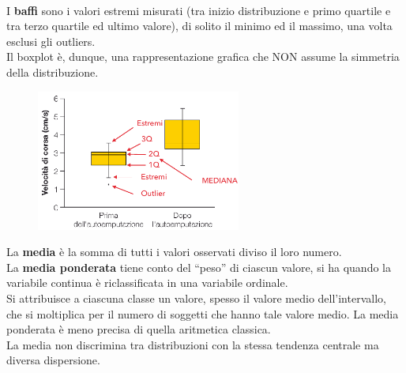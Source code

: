 \documentclass[10pt, draft]{book}
\begin{document}
\\
I \textbf{baffi} sono i valori estremi misurati (tra inizio distribuzione e primo quartile e tra terzo quartile ed ultimo valore), di solito il minimo ed il massimo, una volta esclusi gli outliers.
\\
Il boxplot è, dunque, una rappresentazione grafica che NON assume la simmetria della distribuzione.
    \begin{figure}[h]\label{fig3.2-2}
    \centering
    \includegraphics[width=0.6\textwidth]{fig3.2-2}
    \caption{\small{}}
    \end{figure}
La \textbf{media} è la somma di tutti i valori osservati diviso il loro numero.
\\
La \textbf{media ponderata} tiene conto del “peso” di ciascun valore, si ha quando la variabile continua è riclassificata in una variabile ordinale.
\\
Si attribuisce a ciascuna classe un valore, spesso il valore medio dell’intervallo, che si moltiplica per il numero di soggetti che hanno tale valore medio. La media ponderata è meno precisa di quella aritmetica classica.
\\
La media non discrimina tra distribuzioni con la stessa tendenza centrale ma diversa dispersione.
\end{document}
